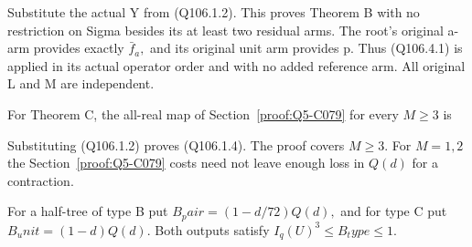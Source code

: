 Substitute the actual Y from (Q106.1.2). This proves Theorem B with no
restriction on Sigma besides its at least two residual arms. The root's
original a-arm provides exactly \(\bar f_a,\allowbreak \) and its original unit arm provides
p. Thus (Q106.4.1) is applied in its actual operator order and with no added
reference arm. All original L and M are independent.

For Theorem C, the all-real map of Section~\ref{proof:Q5-C079} for every \(M\ge 3\) is


Substituting (Q106.1.2) proves (Q106.1.4). The proof covers \(M\ge3\). For \(M=1,2\) the Section~\ref{proof:Q5-C079} costs need not leave enough loss in \(Q(d)\) for a contraction.

For a half-tree of type B put \(B_pair=(1-d/72)Q(d),\allowbreak \) and for type C put
\(B_unit=(1-d)Q(d).\) Both outputs satisfy \(I_q(U)^3\le B_type\le 1.\)

